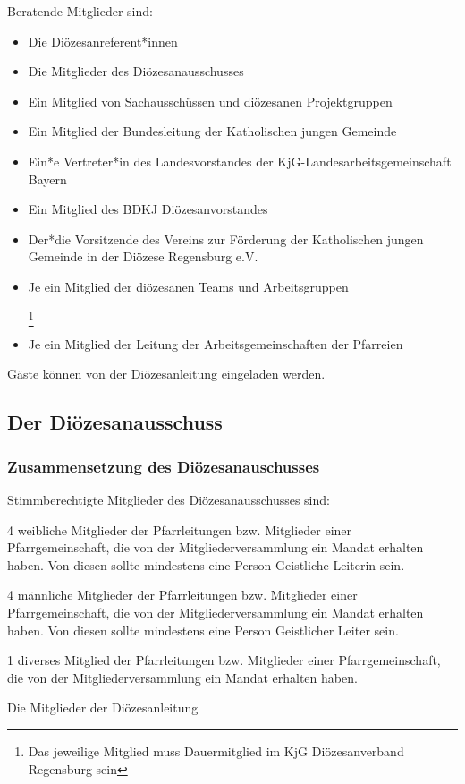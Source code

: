 \documentclass[12pt]{report}
\newcommand{\footnoteremember}[2]{
  \footnote{#2}
  \newcounter{#1}
  \setcounter{#1}{\value{footnote}}
}
\newcommand{\footnoterecall}[1]{%
  \footnotemark[\value{#1}]
}
\begin{document}
\begin{flushleft}
Beratende Mitglieder sind:
\begin{itemize}
  \item Die Diözesanreferent*innen
  \item Die Mitglieder des Diözesanausschusses
  \item Ein Mitglied von Sachausschüssen und diözesanen Projektgruppen
  \item Ein Mitglied der Bundesleitung der Katholischen jungen Gemeinde
  \item Ein*e Vertreter*in des Landesvorstandes der KjG-Landesarbeitsgemeinschaft Bayern
  \item Ein Mitglied des BDKJ Diözesanvorstandes
  \item Der*die Vorsitzende des Vereins zur Förderung der Katholischen jungen Gemeinde in der
        Diözese Regensburg e.V.
  \item Je ein Mitglied der diözesanen Teams und Arbeitsgruppen
        \footnoteremember{Dauermitglied}{Das jeweilige Mitglied muss Dauermitglied im KjG Diözesanverband Regensburg sein}
  \item Je ein Mitglied der Leitung der Arbeitsgemeinschaften der Pfarreien \footnoterecall{Dauermitglied}
\end{itemize}

Gäste können von der Diözesanleitung eingeladen werden.

\subsection{Der Diözesanausschuss}
\subsubsection{Zusammensetzung des Diözesanauschusses}
Stimmberechtigte Mitglieder des Diözesanausschusses sind:
\begin{itemize}
  \item 4 weibliche Mitglieder der Pfarrleitungen bzw. Mitglieder einer Pfarrgemeinschaft, die von der
        Mitgliederversammlung ein Mandat erhalten haben. Von diesen sollte mindestens eine Person
        Geistliche Leiterin sein.
  \item 4 männliche Mitglieder der Pfarrleitungen bzw. Mitglieder einer Pfarrgemeinschaft, die von
        der Mitgliederversammlung ein Mandat erhalten haben. Von diesen sollte mindestens eine
        Person Geistlicher Leiter sein.
  {\color{red}\item 1 diverses Mitglied der Pfarrleitungen bzw. Mitglieder einer Pfarrgemeinschaft, die von
        der Mitgliederversammlung ein Mandat erhalten haben.}
  \item Die Mitglieder der Diözesanleitung
\end{itemize}

\end{flushleft}
\end{document}
